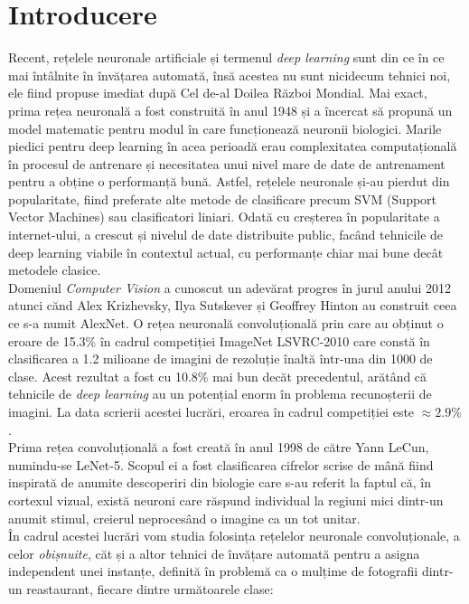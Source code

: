 \documentclass[11pt]{article}
\begin{document}
\section{Introducere}
Recent, rețelele neuronale artificiale și termenul \textit{deep learning} sunt din ce în ce mai întâlnite în învățarea automată, însă acestea nu sunt nicidecum tehnici noi, ele fiind propuse imediat după Cel de-al Doilea Război Mondial. Mai exact, prima rețea neuronală a fost construită în anul 1948 și a încercat să propună un model matematic pentru modul în care funcționează neuronii biologici. Marile piedici pentru deep learning în acea perioadă erau complexitatea computațională în procesul de antrenare și necesitatea unui nivel mare de date de antrenament pentru a obține o performanță bună. Astfel, rețelele neuronale și-au pierdut din popularitate, fiind preferate alte metode de clasificare precum SVM (Support Vector Machines) sau clasificatori liniari. Odată cu creșterea în popularitate a internet-ului, a crescut și nivelul de date distribuite public, facând tehnicile de deep learning viabile în contextul actual, cu performanțe chiar mai bune decât metodele clasice. \\

Domeniul \textit{Computer Vision} a cunoscut un adevărat progres în jurul anului 2012 atunci cănd Alex Krizhevsky, Ilya Sutskever și Geoffrey Hinton au construit ceea ce s-a numit AlexNet. O rețea neuronală convoluțională prin care au obținut o eroare de 15.3\% în cadrul competiției ImageNet LSVRC-2010 care constă în clasificarea a 1.2 milioane de imagini de rezoluție înaltă într-una din 1000 de clase. Acest rezultat a fost cu 10.8\% mai bun decăt precedentul, arătând că tehnicile de \textit{deep learning} au un potențial enorm în problema recunoșterii de imagini. La data scrierii acestei lucrări, eroarea în cadrul competiției este $\approx 2.9\%$.\\

Prima rețea convoluțională a fost creată în anul 1998 de către Yann LeCun, numindu-se LeNet-5. Scopul ei a fost clasificarea cifrelor scrise de mână fiind inspirată de anumite descoperiri din biologie care s-au referit la faptul că, în cortexul vizual, există neuroni care răspund individual la regiuni mici dintr-un anumit stimul, creierul neprocesând o imagine ca un tot unitar. \\

În cadrul acestei lucrări vom studia folosința rețelelor neuronale convoluționale, a celor \textit{obișnuite}, căt și a altor tehnici de învățare automată pentru a asigna independent unei instanțe, definită în problemă ca o mulțime de fotografii dintr-un reastaurant, fiecare dintre următoarele clase: \\
\end{document}
